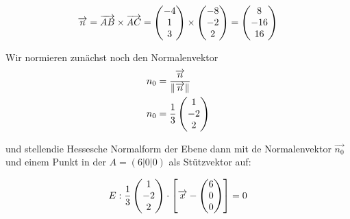 \documentclass[main.tex]{subfiles}
\begin{document}
$$\overrightarrow{n} = \overrightarrow{AB} \times \overrightarrow{AC} = \begin{pmatrix} -4 \\ 1 \\ 3 \end{pmatrix} \times \begin{pmatrix} -8 \\ -2 \\ 2 \end{pmatrix} = \vektor{8\\ -16 \\ 16}$$

Wir normieren zunächst noch den Normalenvektor
\begin{align*}
	n_0 &= \frac{\overrightarrow{n}}{{\|\overrightarrow{n}\|}} \\
	n_0 &= \frac{1}{3} \vektor{1\\ -2 \\ 2}
\end{align*}

und stellendie Hessesche Normalform der Ebene dann mit de Normalenvektor $\overrightarrow{n_0}$ und einem Punkt in der $A=(6|0|0)$ als Stützvektor auf:

$$
	E: \frac{1}{3} \vektor{1\\ -2 \\ 2} \cdot \left[ \overrightarrow{x} - \vektor{6 \\ 0 \\ 0} \right] = 0
$$
\end{document}
